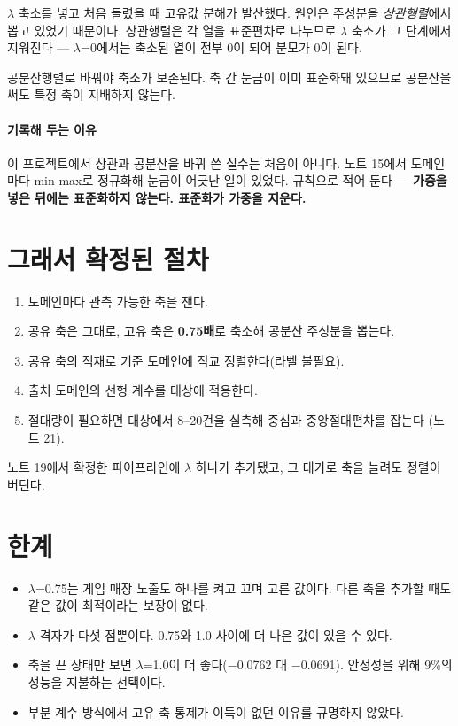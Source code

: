 \documentclass[10pt]{article}
\begin{document}
$\lambda$ 축소를 넣고 처음 돌렸을 때 고유값 분해가 발산했다. 원인은 주성분을
\emph{상관행렬}에서 뽑고 있었기 때문이다. 상관행렬은 각 열을 표준편차로 나누므로
$\lambda$ 축소가 그 단계에서 지워진다 --- $\lambda$=0에서는 축소된 열이 전부 0이
되어 분모가 0이 된다.

공분산행렬로 바꿔야 축소가 보존된다. 축 간 눈금이 이미 표준화돼 있으므로
공분산을 써도 특정 축이 지배하지 않는다.

\paragraph{기록해 두는 이유}
이 프로젝트에서 상관과 공분산을 바꿔 쓴 실수는 처음이 아니다. 노트 15에서
도메인마다 min-max로 정규화해 눈금이 어긋난 일이 있었다. 규칙으로 적어 둔다 ---
\textbf{가중을 넣은 뒤에는 표준화하지 않는다. 표준화가 가중을 지운다.}

\section{그래서 확정된 절차}

\begin{enumerate}[leftmargin=1.3em,itemsep=0.2em]
\item 도메인마다 관측 가능한 축을 잰다.
\item 공유 축은 그대로, 고유 축은 \textbf{0.75배}로 축소해 공분산 주성분을 뽑는다.
\item 공유 축의 적재로 기준 도메인에 직교 정렬한다(라벨 불필요).
\item 출처 도메인의 선형 계수를 대상에 적용한다.
\item 절대량이 필요하면 대상에서 8--20건을 실측해 중심과 중앙절대편차를 잡는다
      (노트 21).
\end{enumerate}

노트 19에서 확정한 파이프라인에 $\lambda$ 하나가 추가됐고, 그 대가로 축을
늘려도 정렬이 버틴다.

\section{한계}

\begin{itemize}[leftmargin=1.1em,itemsep=0.15em]
\item $\lambda$=0.75는 게임 매장 노출도 하나를 켜고 끄며 고른 값이다. 다른 축을
      추가할 때도 같은 값이 최적이라는 보장이 없다.
\item $\lambda$ 격자가 다섯 점뿐이다. 0.75와 1.0 사이에 더 나은 값이 있을 수 있다.
\item 축을 끈 상태만 보면 $\lambda$=1.0이 더 좋다($-$0.0762 대 $-$0.0691). 안정성을
      위해 9\%의 성능을 지불하는 선택이다.
\item 부분 계수 방식에서 고유 축 통제가 이득이 없던 이유를 규명하지 않았다.
\end{itemize}
\end{document}
